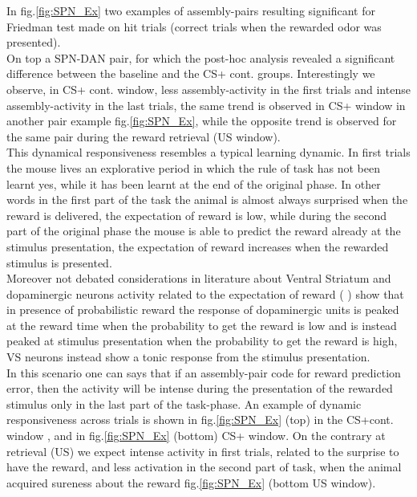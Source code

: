 In fig.\ref{fig:SPN_Ex} two examples of assembly-pairs resulting significant for Friedman test made on hit trials (correct trials when the rewarded odor was presented).\\On top a SPN-DAN pair, for which the post-hoc analysis revealed a significant difference between the baseline and the CS+ cont. groups. Interestingly we observe, in CS+ cont. window, less assembly-activity in the first trials and intense assembly-activity in the last trials, the same trend is observed in CS+ window in another pair example fig.\ref{fig:SPN_Ex}, while the opposite trend is observed for the same pair during the reward retrieval (US window).\\This dynamical responsiveness resembles a typical learning dynamic. In first trials the mouse lives an explorative period in which the rule of task has not been learnt yes, while it has been learnt at the end of the original phase. In other words in the first part of the task the animal is almost always surprised when the reward is delivered, the expectation of reward is low, while during the second part of the original phase the mouse is able to predict the reward already at the stimulus presentation, the expectation of reward increases when the rewarded stimulus is presented.\\Moreover not debated considerations in literature about Ventral Striatum and dopaminergic neurons activity related to the expectation of reward (\cite{Schultz1992} \cite{Schultz} \cite{Fiorillo}) show that in presence of probabilistic reward the response of dopaminergic units is peaked at the reward time when the probability to get the reward is low and is instead peaked at stimulus presentation when the probability to get the reward is high, VS neurons instead show a tonic response from the stimulus presentation.\\In this scenario one can says that if an assembly-pair code for reward prediction error, then the activity will be intense during the presentation of the rewarded stimulus only in the last part of the task-phase. An example of dynamic responsiveness across trials is shown in fig.\ref{fig:SPN_Ex} (top) in the CS+cont. window , and in fig.\ref{fig:SPN_Ex} (bottom) CS+ window. On the contrary at retrieval (US) we expect intense activity in first trials, related to the surprise to have the reward, and less activation in the second part of task, when the animal acquired sureness about the reward fig.\ref{fig:SPN_Ex} (bottom US window).\\
